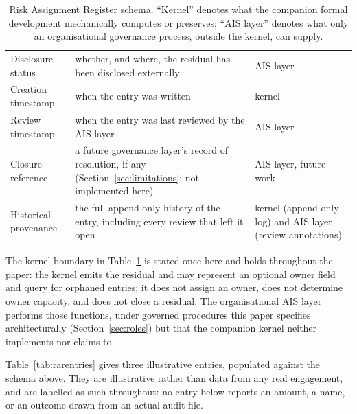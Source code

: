 \documentclass[11pt,a4paper]{article}
\theoremstyle{definition}
\theoremstyle{remark}
\begin{document}
\begin{table}[htbp]
\begin{tabular}{>{\raggedright\arraybackslash}p{3.6cm}>{\raggedright\arraybackslash}p{5.4cm}>{\raggedright\arraybackslash}p{2.6cm}}
Disclosure status & whether, and where, the residual has been disclosed externally & AIS layer \\
Creation timestamp & when the entry was written & kernel \\
Review timestamp & when the entry was last reviewed by the AIS layer & AIS layer \\
Closure reference & a future governance layer's record of resolution, if any (Section~\ref{sec:limitations}: not implemented here) & AIS layer, future work \\
Historical provenance & the full append-only history of the entry, including every review that left it open & kernel (append-only log) and AIS layer (review annotations) \\
\bottomrule
\end{tabular}
\caption{Risk Assignment Register schema. ``Kernel'' denotes what the companion formal development mechanically computes or preserves; ``AIS layer'' denotes what only an organisational governance process, outside the kernel, can supply.}
\label{tab:rarschema}
\end{table}

The kernel boundary in Table~\ref{tab:rarschema} is stated once here and holds throughout the paper: the kernel emits the residual and may represent an optional owner field and query for orphaned entries; it does not assign an owner, does not determine owner capacity, and does not close a residual. The organisational AIS layer performs those functions, under governed procedures this paper specifies architecturally (Section~\ref{sec:roles}) but that the companion kernel neither implements nor claims to.

Table~\ref{tab:rarentries} gives three illustrative entries, populated against the schema above. They are illustrative rather than data from any real engagement, and are labelled as such throughout: no entry below reports an amount, a name, or an outcome drawn from an actual audit file.
\end{document}
